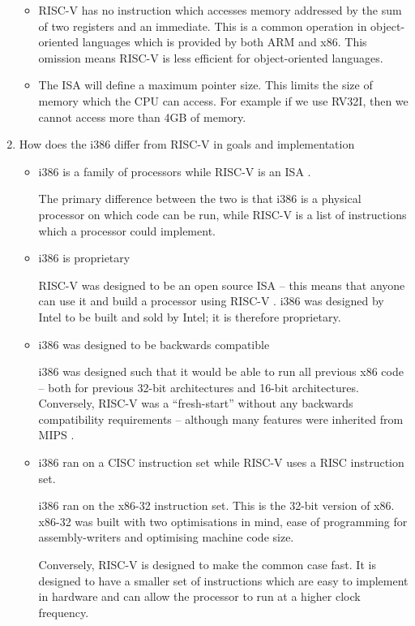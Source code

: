 \documentclass[10pt,\jkfside,a4paper]{article}
\begin{document}
\begin{enumerate}
\begin{itemize}
\item RISC-V has no instruction which accesses memory addressed by the sum
of two registers and an immediate. This is a common operation in
object-oriented languages which is provided by both ARM and x86. This omission
means RISC-V is less efficient for object-oriented languages.

\item The ISA will define a maximum pointer size. This limits the size of
memory which the CPU can access. For example if we use RV32I, then we
cannot access more than 4GB of memory.

\end{itemize}

\item How does the i386 differ from RISC-V in goals and implementation

\begin{itemize}

\item i386 is a family of processors while RISC-V is an ISA .

The primary difference between the two is that i386 is a physical processor
on which code can be run, while RISC-V is a list of instructions which a
processor could implement.

\item i386 is proprietary

RISC-V was designed to be an open source ISA -- this means that anyone can
use it and build a processor using RISC-V . i386 was designed by Intel to be
built and sold by Intel; it is therefore proprietary.

\item i386 was designed to be backwards compatible

i386 was designed such that it would be able to run all previous x86 code --
both for previous 32-bit architectures and 16-bit architectures. Conversely,
RISC-V was a ``fresh-start'' without any backwards compatibility
requirements -- although many features were inherited from MIPS .

\item i386 ran on a CISC instruction set while RISC-V uses a RISC
instruction set.

i386 ran on the x86-32 instruction set. This is the 32-bit version of x86.
x86-32 was built with two optimisations in mind, ease of programming for
assembly-writers and optimising machine code size.

Conversely, RISC-V is designed to make the common case fast. It is designed
to have a smaller set of instructions which are easy to implement in
hardware and can allow the processor to run at a higher clock frequency.


\end{itemize}
\end{enumerate}
\end{document}
